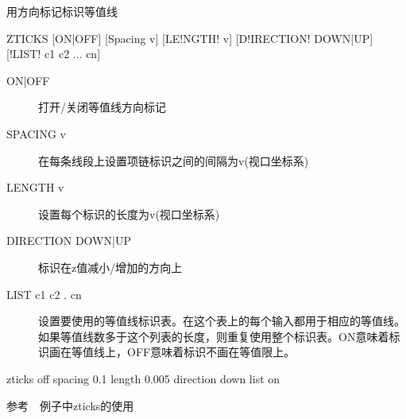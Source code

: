 \label{cmd:zticks}

用方向标记标识等值线

\begin{SACSTX}
ZTICKS [ON|OFF] [Spacing v] [LE!NGTH! v] [D!IRECTION! DOWN|UP]
    [!LIST! c1 c2 ... cn]
\end{SACSTX}

\begin{description}
\item [ON|OFF] 打开/关闭等值线方向标记
\item [SPACING v] 在每条线段上设置项链标识之间的间隔为v(视口坐标系)
\item [LENGTH v] 设置每个标识的长度为v(视口坐标系)
\item [DIRECTION DOWN|UP] 标识在z值减小/增加的方向上
\item [LIST c1 c2 . cn] 设置要使用的等值线标识表。在这个表上的每个输入都用于相应的等值线。如果等值线数多于这个列表的长度，则重复使用整个标识表。ON意味着标识画在等值线上，OFF意味着标识不画在等值限上。
\end{description}

\begin{SACDFT}
zticks off spacing 0.1 length 0.005 direction down list on
\end{SACDFT}

参考~~例子中zticks的使用

